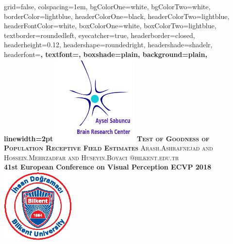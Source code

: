 \documentclass[portrait,final,a0paper,fontscale=0.277]{baposter}
\begin{document}
	\begin{poster}%
		{
			grid=false,
			colspacing=1em,
			bgColorOne=white,
			bgColorTwo=white,
			borderColor=lightblue,
			headerColorOne=black,
			headerColorTwo=lightblue,
			headerFontColor=white,
			boxColorOne=white,
			boxColorTwo=lightblue,
			textborder=roundedleft,
			eyecatcher=true,
			headerborder=closed,
			headerheight=0.12\textheight,
			headershape=roundedright,
			headershade=shadelr,
			headerfont=\Large\bf\textsc, %
			textfont={\setlength{\parindent}{1.5em}},
			boxshade=plain,
			background=plain,
			linewidth=2pt
		}
		{\includegraphics[height=12.0em]{images/BAM.png}} 
		{\bf\textsc{Test of Goodness of Population Receptive Field Estimates}\vspace{0.3em}}
		{\textsc{ Arash.Ashrafnejad and Hossein.Mehrzadfar and Huseyin.Boyaci @bilkent.edu.tr}\\
			\vspace{1em}
			\bf41st European Conference on Visual Perception ECVP 2018}
		{%
			\includegraphics[height=10.0em]{images/bilkent.eps}
		}
		

\end{poster}
\end{document}
